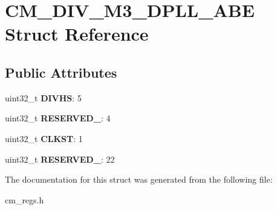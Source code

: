 \hypertarget{structCM__DIV__M3__DPLL__ABE}{\section{C\-M\-\_\-\-D\-I\-V\-\_\-\-M3\-\_\-\-D\-P\-L\-L\-\_\-\-A\-B\-E Struct Reference}
\label{structCM__DIV__M3__DPLL__ABE}
}
\subsection*{Public Attributes}
\begin{DoxyCompactItemize}
\item 
\hypertarget{structCM__DIV__M3__DPLL__ABE_ad0d8006a58af60df4f140ce60ae0f9d2}{uint32\-\_\-t {\bfseries D\-I\-V\-H\-S}\-: 5}\label{structCM__DIV__M3__DPLL__ABE_ad0d8006a58af60df4f140ce60ae0f9d2}

\item 
\hypertarget{structCM__DIV__M3__DPLL__ABE_ab6f365df83712a3117956e730a5ebec5}{uint32\-\_\-t {\bfseries R\-E\-S\-E\-R\-V\-E\-D\-\_}\-: 4}\label{structCM__DIV__M3__DPLL__ABE_ab6f365df83712a3117956e730a5ebec5}

\item 
\hypertarget{structCM__DIV__M3__DPLL__ABE_a69a11de8aba8fdb9d29de2c1447a9bcd}{uint32\-\_\-t {\bfseries C\-L\-K\-S\-T}\-: 1}\label{structCM__DIV__M3__DPLL__ABE_a69a11de8aba8fdb9d29de2c1447a9bcd}

\item 
\hypertarget{structCM__DIV__M3__DPLL__ABE_ac43125784348a191a800c7f35f3e3340}{uint32\-\_\-t {\bfseries R\-E\-S\-E\-R\-V\-E\-D\-\_}\-: 22}\label{structCM__DIV__M3__DPLL__ABE_ac43125784348a191a800c7f35f3e3340}

\end{DoxyCompactItemize}


The documentation for this struct was generated from the following file\-:\begin{DoxyCompactItemize}
\item 
cm\-\_\-regs.\-h\end{DoxyCompactItemize}
